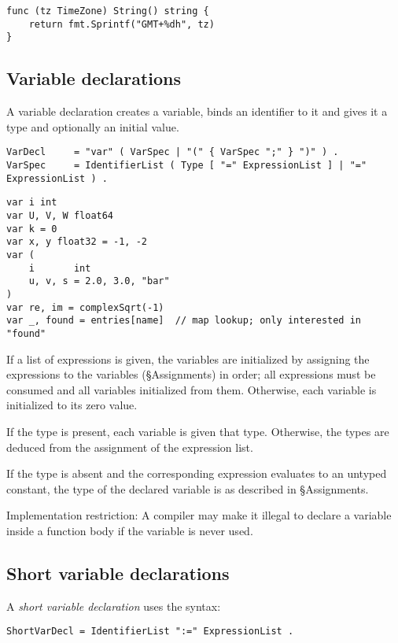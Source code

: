 {\begin{Verbatim}[frame=single]
func (tz TimeZone) String() string {
    return fmt.Sprintf("GMT+%dh", tz)
}
\end{Verbatim}

\subsection*{Variable declarations}

A variable declaration creates a variable, binds an identifier to it and
gives it a type and optionally an initial value.

\begin{Verbatim}[frame=single]
VarDecl     = "var" ( VarSpec | "(" { VarSpec ";" } ")" ) .
VarSpec     = IdentifierList ( Type [ "=" ExpressionList ] | "=" ExpressionList ) .
\end{Verbatim}

\begin{Verbatim}[frame=single]
var i int
var U, V, W float64
var k = 0
var x, y float32 = -1, -2
var (
    i       int
    u, v, s = 2.0, 3.0, "bar"
)
var re, im = complexSqrt(-1)
var _, found = entries[name]  // map lookup; only interested in "found"
\end{Verbatim}

If a list of expressions is given, the variables are initialized by
assigning the expressions to the variables
(§Assignments) in order; all expressions must be
consumed and all variables initialized from them. Otherwise, each
variable is initialized to its zero value.

If the type is present, each variable is given that type. Otherwise, the
types are deduced from the assignment of the expression list.

If the type is absent and the corresponding expression evaluates to an
untyped constant, the type of the declared
variable is as described in §Assignments.

Implementation restriction: A compiler may make it illegal to declare a
variable inside a function body if
the variable is never used.

\subsection*{Short variable declarations}

A \emph{short variable declaration} uses the syntax:

\begin{Verbatim}[frame=single]
ShortVarDecl = IdentifierList ":=" ExpressionList .
\end{Verbatim}

}

